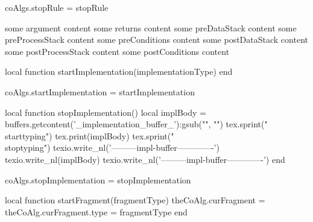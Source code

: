 coAlgs.stopRule = stopRule
\stopLuaCode

\startConTest
  \startRule[testRule]
    \arguments
      some argument content
    \returns
      some returns content
    \preDataStack
      some preDataStack content
    \preProcessStack
      some preProcessStack content
    \preConditions
      some preConditions content
    \postDataStack
      some postDataStack content
    \postProcessStack
      some postProcessStack content
    \postConditions  
      some postConditions content
  \stopRule
\stopConTest
\stopTestCase
\stopTestSuite


\startMkIVCode
\let\stopImplementation\relax

\def\stopImplementationDone{
  \directlua{thirddata.joyLoLCoAlgs.stopImplementation()}
}

\def\startImplementation[#1]{
  \directlua{thirddata.joyLoLCoAlgs.startImplementation('#1')}
  \buff_pickup{_implementation_buffer_}%
    {startImplementation}{stopImplementation}%
    {\relax}{\stopImplementationDone}\plusone%
}
\stopMkIVCode

\startLuaCode
local function startImplementation(implementationType)
end

coAlgs.startImplementation = startImplementation

local function stopImplementation()
  local implBody  = buffers.getcontent('_implementation_buffer_'):gsub("", "\n")
  tex.sprint("\\starttyping")
  tex.print(implBody)
  tex.sprint("\\stoptyping")
  texio.write_nl('---------impl-buffer-------------')
  texio.write_nl(implBody)
  texio.write_nl('---------impl-buffer-------------')
end

coAlgs.stopImplementation = stopImplementation
\stopLuaCode

\stopTestSuite


\startMkIVCode
\let\stopFragment\relax

\def\stopFragmentDone{
  \directlua{thirddata.joyLoLCoAlgs.stopFragment()}
}

\def\startFragment[#1]{
  \directlua{thirddata.joyLoLCoAlgs.startFragment('#1')}
  \buff_pickup{_fragment_buffer_}%
    {startFragment}{stopFragment}%
    {\relax}{\stopFragmentDone}\plusone%
}
\stopMkIVCode

\startLuaCode
local function startFragment(fragmentType)
  theCoAlg.curFragment      = { }
  theCoAlg.curFragment.type = fragmentType
end

